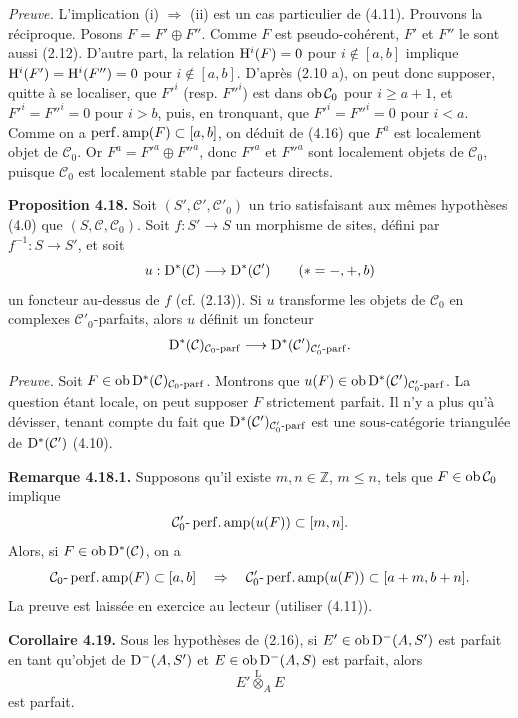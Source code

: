 \documentclass[11pt]{article}
\begin{document}
\emph{Preuve.} L'implication (i) \(\Rightarrow\) (ii) est un cas particulier de (4.11). Prouvons la réciproque. Posons \(F=F'\oplus F''\). Comme \(F\) est pseudo-cohérent, \(F'\) et \(F''\) le sont aussi (2.12). D'autre part, la relation \(\mathrm H^i(F)=0\) pour \(i\notin[a,b]\) implique \(\mathrm H^i(F')=\mathrm H^i(F'')=0\) pour \(i\notin[a,b]\). D'après (2.10 a), on peut donc supposer, quitte à se localiser, que \(F'^i\) (resp. \(F''^i\)) est dans \(\operatorname{ob}\mathcal C_0\) pour \(i\geq a+1\), et \(F'^i=F''^i=0\) pour \(i>b\), puis, en tronquant, que \(F'^i=F''^i=0\) pour \(i<a\). Comme on a \(\operatorname{perf.amp}(F)\subset[a,b]\), on déduit de (4.16) que \(F^a\) est localement objet de \(\mathcal C_0\). Or \(F^a=F'^a\oplus F''^a\), donc \(F'^a\) et \(F''^a\) sont localement objets de \(\mathcal C_0\), puisque \(\mathcal C_0\) est localement stable par facteurs directs.

\textbf{Proposition 4.18.} Soit \((S',\mathcal C',\mathcal C'_0)\) un trio satisfaisant aux mêmes hypothèses (4.0) que \((S,\mathcal C,\mathcal C_0)\). Soit \(f:S'\to S\) un morphisme de sites, défini par \(f^{-1}:S\to S'\), et soit
\[
  u:\mathrm D^*(\mathcal C)\longrightarrow \mathrm D^*(\mathcal C')\qquad (*=-,+,b)
\]
un foncteur au-dessus de \(f\) (cf. (2.13)). Si \(u\) transforme les objets de \(\mathcal C_0\) en complexes \(\mathcal C'_0\)-parfaits, alors \(u\) définit un foncteur
\[
  \mathrm D^*(\mathcal C)_{\mathcal C_0\text{-}\mathrm{parf}}
  \longrightarrow
  \mathrm D^*(\mathcal C')_{\mathcal C'_0\text{-}\mathrm{parf}}.
\]

\emph{Preuve.} Soit \(F\in\operatorname{ob}\mathrm D^*(\mathcal C)_{\mathcal C_0\text{-}\mathrm{parf}}\). Montrons que \(u(F)\in\operatorname{ob}\mathrm D^*(\mathcal C')_{\mathcal C'_0\text{-}\mathrm{parf}}\). La question étant locale, on peut supposer \(F\) strictement parfait. Il n'y a plus qu'à dévisser, tenant compte du fait que \(\mathrm D^*(\mathcal C')_{\mathcal C'_0\text{-}\mathrm{parf}}\) est une sous-catégorie triangulée de \(\mathrm D^*(\mathcal C')\) (4.10).

\textbf{Remarque 4.18.1.} Supposons qu'il existe \(m,n\in\mathbb Z\), \(m\leq n\), tels que \(F\in\operatorname{ob}\mathcal C_0\) implique
\[
  \mathcal C'_0\text{-}\operatorname{perf.amp}(u(F))\subset[m,n].
\]
Alors, si \(F\in\operatorname{ob}\mathrm D^*(\mathcal C)\), on a
\[
  \mathcal C_0\text{-}\operatorname{perf.amp}(F)
  \subset[a,b]
  \quad\Rightarrow\quad
  \mathcal C'_0\text{-}\operatorname{perf.amp}(u(F))
  \subset[a+m,b+n].
\]
La preuve est laissée en exercice au lecteur (utiliser (4.11)).

\textbf{Corollaire 4.19.} Sous les hypothèses de (2.16), si \(E'\in\operatorname{ob}\mathrm D^-(A,S')\) est parfait en tant qu'objet de \(\mathrm D^-(A,S')\) et \(E\in\operatorname{ob}\mathrm D^-(A,S)\) est parfait, alors
\[
  E'\overset{\mathrm L}{\otimes}_A E
\]
est parfait.
\end{document}
